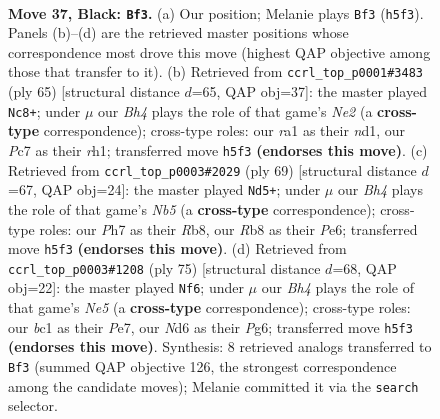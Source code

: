 \documentclass[11pt]{article}
\begin{document}
\clearpage

\begin{figure}[p]\centering
\begin{subfigure}{0.46\textwidth}\centering
\resizebox{\linewidth}{!}{%
\newchessgame
\chessboard[
  setfen={1r5k/2p2p1p/p1Pn4/P4pKb/4p3/6P1/8/RNB5 b - - 5 37},
  showmover=false,
  pgfstyle=straightmove, color=movearrow, markmove={h5-f3}
]}
\caption{}
\end{subfigure}\hfill
\begin{subfigure}{0.46\textwidth}\centering
\resizebox{\linewidth}{!}{%
\newchessgame
\chessboard[
  setfen={8/4npk1/3Kb1p1/7p/4P2P/r1P5/4B1P1/3N3R b - - 5 33},
  showmover=false,
  pgfstyle=straightmove, color=movearrow, markmove={e7-c8}
]}
\caption{}
\end{subfigure}
\\[4pt]
\begin{subfigure}{0.46\textwidth}\centering
\resizebox{\linewidth}{!}{%
\newchessgame
\chessboard[
  setfen={1r6/4k1p1/p3pp1p/1pP4P/Pn6/2K2P2/1P4P1/R3B3 b - - 10 35},
  showmover=false,
  pgfstyle=straightmove, color=movearrow, markmove={b4-d5}
]}
\caption{}
\end{subfigure}\hfill
\begin{subfigure}{0.46\textwidth}\centering
\resizebox{\linewidth}{!}{%
\newchessgame
\chessboard[
  setfen={r7/4p2p/3k2p1/p2Pp3/P3n3/1P2K3/6PP/2R1B3 b - - 9 38},
  showmover=false,
  pgfstyle=straightmove, color=movearrow, markmove={e4-f6}
]}
\caption{}
\end{subfigure}
\caption{\textbf{Move 37, Black: \texttt{Bf3}.} (a) Our position; Melanie plays \texttt{Bf3} (\texttt{h5f3}). Panels (b)--(d) are the retrieved master positions whose correspondence most drove this move (highest QAP objective among those that transfer to it). (b) Retrieved from \texttt{ccrl\_top\_p0001\#3483} (ply 65) [structural distance $d$=65, QAP obj=37]: the master played \texttt{Nc8+}; under $\mu$ our \emph{Bh4} plays the role of that game's \emph{Ne2} (a \textbf{cross-type} correspondence); cross-type roles: our \emph{r}a1 as their \emph{n}d1, our \emph{P}c7 as their \emph{r}h1; transferred move \texttt{h5f3} \textbf{(endorses this move)}. (c) Retrieved from \texttt{ccrl\_top\_p0003\#2029} (ply 69) [structural distance $d$=67, QAP obj=24]: the master played \texttt{Nd5+}; under $\mu$ our \emph{Bh4} plays the role of that game's \emph{Nb5} (a \textbf{cross-type} correspondence); cross-type roles: our \emph{P}h7 as their \emph{R}b8, our \emph{R}b8 as their \emph{P}e6; transferred move \texttt{h5f3} \textbf{(endorses this move)}. (d) Retrieved from \texttt{ccrl\_top\_p0003\#1208} (ply 75) [structural distance $d$=68, QAP obj=22]: the master played \texttt{Nf6}; under $\mu$ our \emph{Bh4} plays the role of that game's \emph{Ne5} (a \textbf{cross-type} correspondence); cross-type roles: our \emph{b}c1 as their \emph{P}e7, our \emph{N}d6 as their \emph{P}g6; transferred move \texttt{h5f3} \textbf{(endorses this move)}. Synthesis: 8 retrieved analogs transferred to \texttt{Bf3} (summed QAP objective 126, the strongest correspondence among the candidate moves); Melanie committed it via the \texttt{search} selector.}
\label{fig:thought-m73}
\end{figure}
\end{document}
